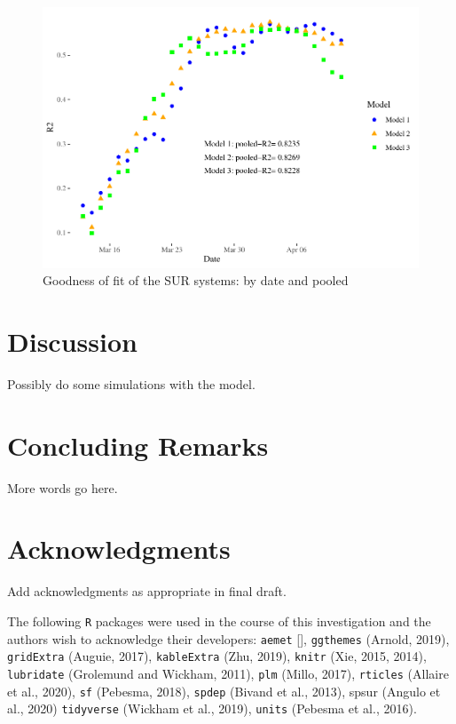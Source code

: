 \documentclass[]{elsarticle} %
\makeatletter
\def\maxwidth{\ifdim\Gin@nat@width>\linewidth\linewidth
\else\Gin@nat@width\fi}
\let\Oldincludegraphics\includegraphics
\renewcommand{\includegraphics}[1]{\Oldincludegraphics[width=\maxwidth]{#1}}
\makeatother
\begin{document}
\begin{figure}
\centering
\includegraphics{Climatic-Correlates-of-COVID19-Spain_files/figure-latex/goodness-of-fit-1.pdf}
\caption{\label{fig:goodness-of-fit} Goodness of fit of the SUR systems:
by date and pooled}
\end{figure}

\hypertarget{discussion}{%
\section{Discussion}\label{discussion}}

Possibly do some simulations with the model.

\hypertarget{concluding-remarks}{%
\section{Concluding Remarks}\label{concluding-remarks}}

More words go here.

\hypertarget{acknowledgments}{%
\section*{Acknowledgments}\label{acknowledgments}}

Add acknowledgments as appropriate in final draft.

The following \texttt{R} packages were used in the course of this
investigation and the authors wish to acknowledge their developers:
\texttt{aemet} {[}{]}, \texttt{ggthemes} (Arnold, 2019),
\texttt{gridExtra} (Auguie, 2017), \texttt{kableExtra} (Zhu, 2019),
\texttt{knitr} (Xie, 2015, 2014), \texttt{lubridate} (Grolemund and
Wickham, 2011), \texttt{plm} (Millo, 2017), \texttt{rticles} (Allaire et
al., 2020), \texttt{sf} (Pebesma, 2018), \texttt{spdep} (Bivand et al.,
2013), spsur (Angulo et al., 2020) \texttt{tidyverse} (Wickham et al.,
2019), \texttt{units} (Pebesma et al., 2016).
\end{document}
